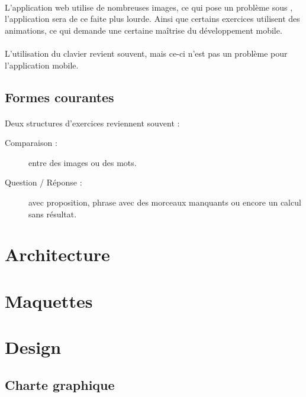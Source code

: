 \documentclass[french]{report}
\begin{document}
\paragraph{}L'application web utilise de nombreuses images, ce qui pose un problème sous \android, l'application sera de ce faite plus lourde. Ainsi que certains exercices utilisent des animations, ce qui demande une certaine ma\^{i}trise du développement mobile.
\paragraph{}L'utilisation du clavier revient souvent, mais ce-ci n'est pas un problème pour l'application mobile.

\subsection{Formes courantes}
\paragraph{}Deux structures d'exercices reviennent souvent :
\begin{description}
\item[Comparaison : ] entre des images ou des mots.
\item[Question / Réponse : ] avec proposition, phrase avec des morceaux manquants ou encore un calcul sans résultat.
\end{description}

\section{Architecture}
\section{Maquettes}

\section{Design}
\subsection{Charte graphique}

\end{document}
